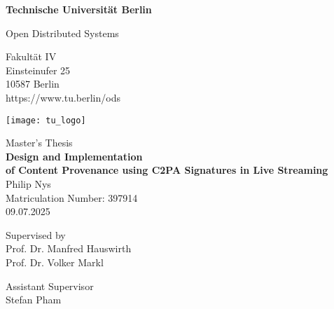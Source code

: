 \thispagestyle{empty}
\begin{center}

\vspace*{1.4cm}
{\LARGE \textbf{Technische Universität Berlin}}

\vspace{0.5cm}

{\large Open Distributed Systems\\[1mm]}

Fakultät IV\\
Einsteinufer 25\\
10587 Berlin\\
https://www.tu.berlin/ods\\

\vspace*{1cm}

\texttt{[image: tu\_logo]}

\vspace*{1.0cm}

{\LARGE Master's Thesis}\\

\vspace{1.0cm}
{\LARGE \textbf{Design and Implementation}}\\
\vspace*{0.3cm}
{\LARGE \textbf{of Content Provenance using C2PA Signatures in Live Streaming}}\\
\vspace*{1.0cm}
{\LARGE Philip Nys}
\\
\vspace*{0.5cm}
Matriculation Number: 397914\\
09.07.2025\\ %
\vspace*{1.0cm}

Supervised by\\
Prof. Dr. Manfred Hauswirth\\
Prof. Dr. Volker Markl

\vspace*{0.5cm}
Assistant Supervisor\\
Stefan Pham\\
\vspace{3cm}


\end{center}

